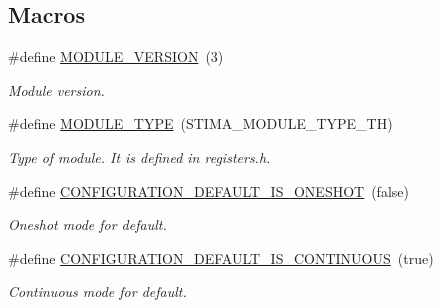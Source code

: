 \subsection*{Macros}
\begin{DoxyCompactItemize}
\item 
\mbox{\label{i2c-th-config_8h_aa8639a8d4e83d9cc4187d7a751228464}} 
\#define \hyperlink{i2c-th-config_8h_aa8639a8d4e83d9cc4187d7a751228464}{M\+O\+D\+U\+L\+E\+\_\+\+V\+E\+R\+S\+I\+ON}~(3)
\begin{DoxyCompactList}\small\item\em Module version. \end{DoxyCompactList}\item 
\mbox{\label{i2c-th-config_8h_a8c815d03b3fd3e18ca06f920a1eb4e8e}} 
\#define \hyperlink{i2c-th-config_8h_a8c815d03b3fd3e18ca06f920a1eb4e8e}{M\+O\+D\+U\+L\+E\+\_\+\+T\+Y\+PE}~(S\+T\+I\+M\+A\+\_\+\+M\+O\+D\+U\+L\+E\+\_\+\+T\+Y\+P\+E\+\_\+\+TH)
\begin{DoxyCompactList}\small\item\em Type of module. It is defined in registers.\+h. \end{DoxyCompactList}\item 
\mbox{\label{i2c-th-config_8h_a5c4024778a87026713c77babd50c06e8}} 
\#define \hyperlink{i2c-th-config_8h_a5c4024778a87026713c77babd50c06e8}{C\+O\+N\+F\+I\+G\+U\+R\+A\+T\+I\+O\+N\+\_\+\+D\+E\+F\+A\+U\+L\+T\+\_\+\+I\+S\+\_\+\+O\+N\+E\+S\+H\+OT}~(false)
\begin{DoxyCompactList}\small\item\em Oneshot mode for default. \end{DoxyCompactList}\item 
\mbox{\label{i2c-th-config_8h_a21819dc42c8c71731e30c99bcf8b0f76}} 
\#define \hyperlink{i2c-th-config_8h_a21819dc42c8c71731e30c99bcf8b0f76}{C\+O\+N\+F\+I\+G\+U\+R\+A\+T\+I\+O\+N\+\_\+\+D\+E\+F\+A\+U\+L\+T\+\_\+\+I\+S\+\_\+\+C\+O\+N\+T\+I\+N\+U\+O\+US}~(true)
\begin{DoxyCompactList}\small\item\em Continuous mode for default. \end{DoxyCompactList}\item 
\mbox{\label{i2c-th-config_8h_a25fb304ef264a84353f1d4cfc61128e9}} 

\end{DoxyCompactItemize}
